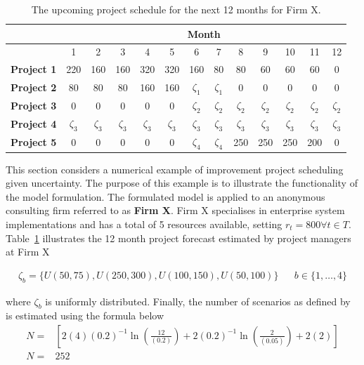 \documentclass[a4paper,11pt]{article}
\begin{document}
\begin{table}[]
\centering
\caption{The upcoming project schedule for the next 12 months for Firm X.}
\vspace{12pt}
\begin{tabular}{r|cccccccccccc}
\hline
\multicolumn{1}{l}{} & \multicolumn{12}{c}{\textbf{Month}}  \\
\hline            
\multicolumn{1}{l}{} & 1 & 2 & 3 & 4 & 5 & 6 & 7 & 8 & 9 & 10 & 11 & 12 \\
\hline 
\textbf{Project 1}   & 220 & 160 & 160 & 320 & 320 & 160 & 80 & 80 & 60 & 60  & 60  & 0  \\
\textbf{Project 2}   & 80 & 80 & 80 & 160 & 160 & $\zeta_1$ & $\zeta_1$ & 0 & 0 & 0  & 0  & 0  \\
\textbf{Project 3}   & 0 & 0 & 0 & 0 & 0 & $\zeta_2$ & $\zeta_2$ & $\zeta_2$ & $\zeta_2$ & $\zeta_2$  & $\zeta_2$  & $\zeta_2$  \\
\textbf{Project 4}   & $\zeta_3$ & $\zeta_3$ & $\zeta_3$ & $\zeta_3$ & $\zeta_3$ & $\zeta_3$ & $\zeta_3$ & $\zeta_3$ & $\zeta_3$ & $\zeta_3$ & $\zeta_3$  & $\zeta_3$  \\
\textbf{Project 5}   & 0 & 0 & 0 & 0 & 0 & $\zeta_4$ & $\zeta_4$ & 250 & 250 & 250  & 200  & 0 \\
\hline
\end{tabular}
\label{tab:projects}
\end{table}

This section considers a numerical example of improvement project scheduling given uncertainty. The purpose of this example is to illustrate the functionality of the model formulation. The formulated model is applied to an anonymous consulting firm referred to as \textbf{Firm X}. Firm X specialises in enterprise system implementations and has a total of 5 resources available, setting $r_t=800 \forall t\in T$. Table~\ref{tab:projects} illustrates the 12 month project forecast estimated by project managers at Firm X 

\begin{align}
	\zeta_b = \{U(50,75),U(250,300),U(100,150),U(50,100)\} && b\in \{1,\dots,4\}
\end{align}

 where $\zeta_b$ is uniformly distributed. Finally, the number of scenarios as defined by \cite{nemirovski2006scenario} is estimated using the formula below
\begin{align}
	N=&[ 2(4)(0.2)^{-1}\ln(\frac{12}{(0.2)}) + 2(0.2)^{-1}\ln(\frac{2}{(0.05)})+2(2)] \\
	\label{q1eqN}
		N=&252
\end{align}
\end{document}
